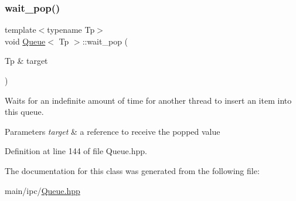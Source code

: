 \subsubsection{\texorpdfstring{wait\_pop()}{wait\_pop()}}
{\footnotesize\ttfamily template$<$typename Tp$>$ \\
void \mbox{\hyperlink{classQueue}{Queue}}$<$ Tp $>$\+::wait\+\_\+pop (\begin{DoxyParamCaption}\item[{Tp \&}]{target }\end{DoxyParamCaption})\hspace{0.3cm}{\ttfamily [inline]}}

Waits for an indefinite amount of time for another thread to insert an item into this queue.


\begin{DoxyParams}{Parameters}
{\em target} & a reference to receive the popped value \\
\hline
\end{DoxyParams}


Definition at line 144 of file Queue.\+hpp.


\begin{DoxyCode}{0}

\end{DoxyCode}


The documentation for this class was generated from the following file\+:\begin{DoxyCompactItemize}
\item 
main/ipc/\mbox{\hyperlink{Queue_8hpp}{Queue.\+hpp}}\end{DoxyCompactItemize}
